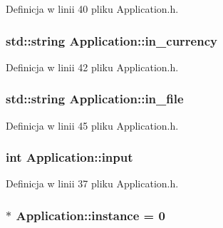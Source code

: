 \-Definicja w linii 40 pliku \-Application.\-h.

\hypertarget{class_application_ad81fdec0c72cb080edfab33439f0d2a9}{
\subsubsection[{in\-\_\-currency}]{\setlength{\rightskip}{0pt plus 5cm}std\-::string {\bf \-Application\-::in\-\_\-currency}}}\label{class_application_ad81fdec0c72cb080edfab33439f0d2a9}


\-Definicja w linii 42 pliku \-Application.\-h.

\hypertarget{class_application_a2b3f25d468a1923a99ca00a17d613907}{
\subsubsection[{in\-\_\-file}]{\setlength{\rightskip}{0pt plus 5cm}std\-::string {\bf \-Application\-::in\-\_\-file}}}\label{class_application_a2b3f25d468a1923a99ca00a17d613907}


\-Definicja w linii 45 pliku \-Application.\-h.

\hypertarget{class_application_a196c830264295cd000204d0668e2262c}{
\subsubsection[{input}]{\setlength{\rightskip}{0pt plus 5cm}int {\bf \-Application\-::input}}}\label{class_application_a196c830264295cd000204d0668e2262c}


\-Definicja w linii 37 pliku \-Application.\-h.

\hypertarget{class_application_abd74a9391b24bd1a1586a1d8b88bb2d3}{
\subsubsection[{instance}]{ $\ast$ {\bf \-Application\-::instance} = 0}}\label{class_application_abd74a9391b24bd1a1586a1d8b88bb2d3}


